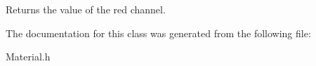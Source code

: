 \begin{DoxyReturn}{Returns}
the value of the red channel. 
\end{DoxyReturn}


The documentation for this class was generated from the following file\-:\begin{DoxyCompactItemize}
\item 
Material.\-h\end{DoxyCompactItemize}

